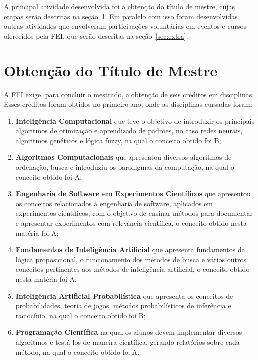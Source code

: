 \documentclass[
  12pt,       %
  oneside,
  a4paper,      %
  english,      %
  french,       %
  spanish,      %
  brazil,       %
  ]{abntex2}
\begin{document}
A principal atividade desenvolvida foi a obtenção do título de mestre, cujas etapas serão descritas na seção~\ref{sec:projeto}.
Em paralelo com isso foram desenvolvidas outras atividades que envolveram participações voluntárias em eventos e cursos oferecidos pela FEI, que serão descritas na seção~\ref{sec:extra}.

\section{Obtenção do Título de Mestre}\label{sec:projeto}

A FEI exige, para concluir o mestrado, a obtenção de seis créditos em disciplinas.
Esses créditos foram obtidos no primeiro ano, onde as disciplinas cursadas foram:
%
\begin{enumerate}
  \item \textbf{Inteligência Computacional} que teve o objetivo de introduzir os principais algoritmos de otimização e aprendizado de padrões, no caso redes neurais, algoritmos genéticos e lógica fuzzy, na qual o conceito obtido foi B;

  \item \textbf{Algoritmos Computacionais} que apresentou diversos algoritmos de ordenação, busca e introduziu os paradigmas da computação, na qual o conceito obtido foi A;

  \item \textbf{Engenharia de Software em Experimentos Científicos} que apresentou os conceitos relacionados à engenharia de software, aplicados em experimentos científicos, com o objetivo de ensinar métodos para documentar e apresentar experimentos com relevância científica, o conceito obtido nesta matéria foi A;

  \item \textbf{Fundamentos de Inteligência Artificial} que apresenta fundamentos da lógica proposicional, o funcionamento dos métodos de busca e vários outros conceitos pertinentes aos métodos de inteligência artificial, o conceito obtido nesta matéria foi A;

  \item \textbf{Inteligência Artificial Probabilística} que apresenta os conceitos de probabilidades, teoria de jogos, métodos probabilísticos de inferência e raciocínio, na qual o conceito obtido foi B;

  \item \textbf{Programação Científica} na qual os alunos devem implementar diversos algoritmos e testá-los de maneira científica, gerando relatórios sobre cada método, na qual o conceito obtido foi A.
\end{enumerate}
\end{document}

